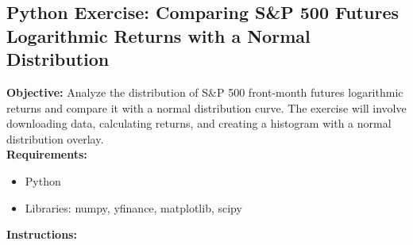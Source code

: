 \documentclass{article}
\begin{document}
\subsection{Python Exercise: Comparing S\&P 500 Futures Logarithmic Returns with a Normal Distribution}

\textbf{Objective:} Analyze the distribution of S\&P 500 front-month futures logarithmic returns and compare it with a normal distribution curve. The exercise will involve downloading data, calculating returns, and creating a histogram with a normal distribution overlay. \\

\textbf{Requirements:}
\begin{itemize}
    \item Python
    \item Libraries: numpy, yfinance, matplotlib, scipy
\end{itemize}

\textbf{Instructions:}
\end{document}
